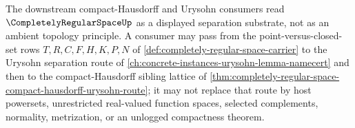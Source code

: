 The downstream compact-Hausdorff and Urysohn consumers read $\CompletelyRegularSpaceUp$ as a displayed separation substrate, not as an ambient topology principle. A consumer may pass from the point-versus-closed-set rows $T,R,C,F,H,K,P,N$ of \autoref{def:completely-regular-space-carrier} to the Urysohn separation route of \autoref{ch:concrete-instances-urysohn-lemma-namecert} and then to the compact-Hausdorff sibling lattice of \autoref{thm:completely-regular-space-compact-hausdorff-urysohn-route}; it may not replace that route by host powersets, unrestricted real-valued function spaces, selected complements, normality, metrization, or an unlogged compactness theorem.
